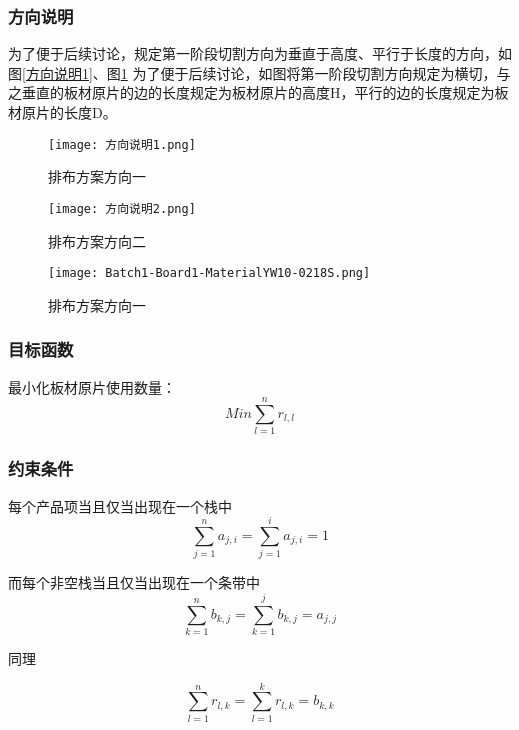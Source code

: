 \documentclass[bwprint]{gmcmthesis}
\begin{document}
\subsubsection{方向说明}
为了便于后续讨论，规定第一阶段切割方向为垂直于高度、平行于长度的方向，如图\ref{方向说明1}、图\ref{方向说明2}
为了便于后续讨论，如图将第一阶段切割方向规定为横切，与之垂直的板材原片的边的长度规定为板材原片的高度H，平行的边的长度规定为板材原片的长度D。
\begin{figure}[!htbp]
    \centering
    \begin{minipage}{0.48\linewidth}
        \centering
        \texttt{[image: 方向说明1.png]}
        \caption{排布方案方向一}\label{方向说明1}
    \end{minipage}
    \begin{minipage}{0.48\linewidth}
        \centering
        \texttt{[image: 方向说明2.png]}
        \caption{排布方案方向二}\label{方向说明2}
    \end{minipage}
\end{figure}

\begin{figure}[!htbp]
        \centering
        \texttt{[image: Batch1-Board1-MaterialYW10-0218S.png]}
        \caption{排布方案方向一}
\end{figure}


\subsubsection{目标函数}
最小化板材原片使用数量：
\begin{equation}
    Min \sum_{l=1}^{n} r_{l,l} 
\end{equation}

\subsubsection{约束条件}
每个产品项当且仅当出现在一个栈中
\begin{equation}
    \sum_{j=1}^{n} a_{j,i}=\sum_{j=1}^{i} a_{j,i}=1
\end{equation}  

而每个非空栈当且仅当出现在一个条带中
\begin{equation}
    \sum_{k=1}^{n} b_{k,j}=\sum_{k=1}^{j} b_{k,j}=a_{j,j}
\end{equation}  

同理

\begin{equation}
    \sum_{l=1}^{n} r_{l,k}=\sum_{l=1}^{k} r_{l,k} =b_{k,k}
\end{equation}  
\end{document}
